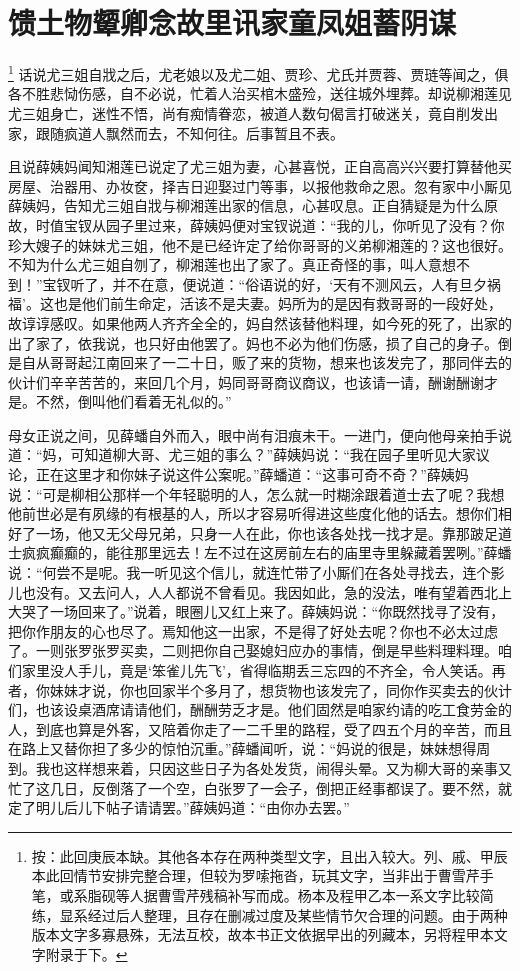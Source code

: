 
\chapter{馈土物颦卿念故里\hspace{.5em}讯家童凤姐蓄阴谋}\footnote{按：此回庚辰本缺。其他各本存在两种类型文字，且出入较大。列、戚、甲辰本此回情节安排完整合理，但较为罗嗦拖沓，玩其文字，当非出于曹雪芹手笔，或系脂砚等人据曹雪芹残稿补写而成。杨本及程甲乙本一系文字比较简练，显系经过后人整理，且存在删减过度及某些情节欠合理的问题。由于两种版本文字多寡悬殊，无法互校，故本书正文依据早出的列藏本，另将程甲本文字附录于下。}
话说尤三姐自戕之后，尤老娘以及尤二姐、贾珍、尤氏并贾蓉、贾琏等闻之，俱各不胜悲恸伤感，自不必说，忙着人治买棺木盛殓，送往城外埋葬。却说柳湘莲见尤三姐身亡，迷性不悟，尚有痴情眷恋，被道人数句偈言打破迷关，竟自削发出家，跟随疯道人飘然而去，不知何往。后事暂且不表。

且说薛姨妈闻知湘莲已说定了尤三姐为妻，心甚喜悦，正自高高兴兴要打算替他买房屋、治器用、办妆奁，择吉日迎娶过门等事，以报他救命之恩。忽有家中小厮见薛姨妈，告知尤三姐自戕与柳湘莲出家的信息，心甚叹息。正自猜疑是为什么原故，时值宝钗从园子里过来，薛姨妈便对宝钗说道：“我的儿，你听见了没有？你珍大嫂子的妹妹尤三姐，他不是已经许定了给你哥哥的义弟柳湘莲的？这也很好。不知为什么尤三姐自刎了，柳湘莲也出了家了。真正奇怪的事，叫人意想不到！”宝钗听了，并不在意，便说道：“俗语说的好，‘天有不测风云，人有旦夕祸福’。这也是他们前生命定，活该不是夫妻。妈所为的是因有救哥哥的一段好处，故谆谆感叹。如果他两人齐齐全全的，妈自然该替他料理，如今死的死了，出家的出了家了，依我说，也只好由他罢了。妈也不必为他们伤感，损了自己的身子。倒是自从哥哥起江南回来了一二十日，贩了来的货物，想来也该发完了，那同伴去的伙计们辛辛苦苦的，来回几个月，妈同哥哥商议商议，也该请一请，酬谢酬谢才是。不然，倒叫他们看着无礼似的。”

母女正说之间，见薛蟠自外而入，眼中尚有泪痕未干。一进门，便向他母亲拍手说道：“妈，可知道柳大哥、尤三姐的事么？”薛姨妈说：“我在园子里听见大家议论，正在这里才和你妹子说这件公案呢。”薛蟠道：“这事可奇不奇？”薛姨妈说：“可是柳相公那样一个年轻聪明的人，怎么就一时糊涂跟着道士去了呢？我想他前世必是有夙缘的有根基的人，所以才容易听得进这些度化他的话去。想你们相好了一场，他又无父母兄弟，只身一人在此，你也该各处找一找才是。靠那跛足道士疯疯癫癫的，能往那里远去！左不过在这房前左右的庙里寺里躲藏着罢咧。”薛蟠说：“何尝不是呢。我一听见这个信儿，就连忙带了小厮们在各处寻找去，连个影儿也没有。又去问人，人人都说不曾看见。我因如此，急的没法，唯有望着西北上大哭了一场回来了。”说着，眼圈儿又红上来了。薛姨妈说：“你既然找寻了没有，把你作朋友的心也尽了。焉知他这一出家，不是得了好处去呢？你也不必太过虑了。一则张罗张罗买卖，二则把你自己娶媳妇应办的事情，倒是早些料理料理。咱们家里没人手儿，竟是‘笨雀儿先飞’，省得临期丢三忘四的不齐全，令人笑话。再者，你妹妹才说，你也回家半个多月了，想货物也该发完了，同你作买卖去的伙计们，也该设桌酒席请请他们，酬酬劳乏才是。他们固然是咱家约请的吃工食劳金的人，到底也算是外客，又陪着你走了一二千里的路程，受了四五个月的辛苦，而且在路上又替你担了多少的惊怕沉重。”薛蟠闻听，说：“妈说的很是，妹妹想得周到。我也这样想来着，只因这些日子为各处发货，闹得头晕。又为柳大哥的亲事又忙了这几日，反倒落了一个空，白张罗了一会子，倒把正经事都误了。要不然，就定了明儿后儿下帖子请请罢。”薛姨妈道：“由你办去罢。”

